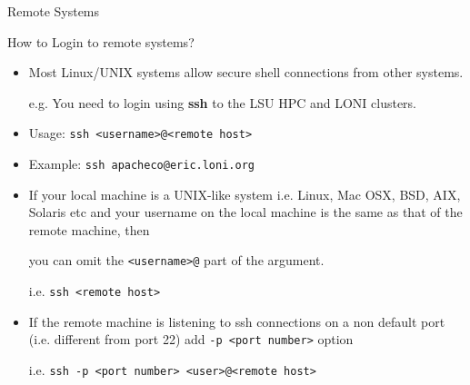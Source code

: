 \documentclass[slidestop,mathserif,compress,xcolor=svgnames]{beamer}
\newenvironment{bblock}[0]
{
\begin{beamerboxesrounded}[upper=uppercol1,lower=lowercol1,shadow=true]}
{\end{beamerboxesrounded}}
\begin{document}
\begin{frame}{\small Remote Systems}
  \begin{bblock}{How to Login to remote systems?}
    \begin{itemize}
      \item Most Linux/UNIX systems allow secure shell connections from other systems.
      \item[e.g.] You need to login using \textbf{ssh} to the LSU HPC and LONI clusters.
      \item Usage: \texttt{ssh <username>@<remote host>}
      \item Example: \texttt{ssh apacheco@eric.loni.org}
      \item If your local machine is a UNIX-like system i.e. Linux, Mac OSX, BSD, AIX, Solaris etc and your username on the local machine is the same as that of the remote machine, then
      \item[] you can omit the \texttt{<username>@} part of the argument.
      \item[] i.e. \texttt{ssh <remote host>}
      \item If the remote machine is listening to ssh connections on a non default port (i.e. different from port 22) add \texttt{-p <port number>} option
      \item[i.e.] \texttt{ssh -p <port number> <user>@<remote host>} 
    \end{itemize}
  \end{bblock}
\end{frame}
\end{document}
